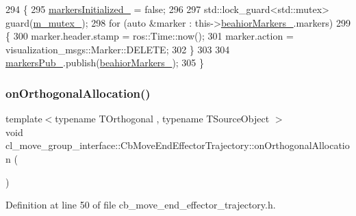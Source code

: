\begin{DoxyCode}
294     \{
295         \hyperlink{classcl__move__group__interface_1_1CbMoveEndEffectorTrajectory_ac140a7f0adfb20f1e2900a5c8cd2ca5b}{markersInitialized\_} = \textcolor{keyword}{false};
296 
297         std::lock\_guard<std::mutex> guard(\hyperlink{classcl__move__group__interface_1_1CbMoveEndEffectorTrajectory_a2a98ef725cb3fc7f61654d3d6a2066bb}{m\_mutex\_});
298         \textcolor{keywordflow}{for} (\textcolor{keyword}{auto} &marker : this->\hyperlink{classcl__move__group__interface_1_1CbMoveEndEffectorTrajectory_a809fb5385adf27c0a1c8f8136566949c}{beahiorMarkers\_}.markers)
299         \{
300             marker.header.stamp = ros::Time::now();
301             marker.action = visualization\_msgs::Marker::DELETE;
302         \}
303 
304         \hyperlink{classcl__move__group__interface_1_1CbMoveEndEffectorTrajectory_aabc2216b2d8625fecd83c5ec69928e63}{markersPub\_}.publish(\hyperlink{classcl__move__group__interface_1_1CbMoveEndEffectorTrajectory_a809fb5385adf27c0a1c8f8136566949c}{beahiorMarkers\_});
305     \}
\end{DoxyCode}
\mbox{\label{classcl__move__group__interface_1_1CbMoveEndEffectorTrajectory_aae4797fba54cb3bf371cc67d26a82186}} 
\subsubsection{\texorpdfstring{on\+Orthogonal\+Allocation()}{onOrthogonalAllocation()}}
{\footnotesize\ttfamily template$<$typename T\+Orthogonal , typename T\+Source\+Object $>$ \\
void cl\+\_\+move\+\_\+group\+\_\+interface\+::\+Cb\+Move\+End\+Effector\+Trajectory\+::on\+Orthogonal\+Allocation (\begin{DoxyParamCaption}{ }\end{DoxyParamCaption})\hspace{0.3cm}{\ttfamily [inline]}}



Definition at line 50 of file cb\+\_\+move\+\_\+end\+\_\+effector\+\_\+trajectory.\+h.



